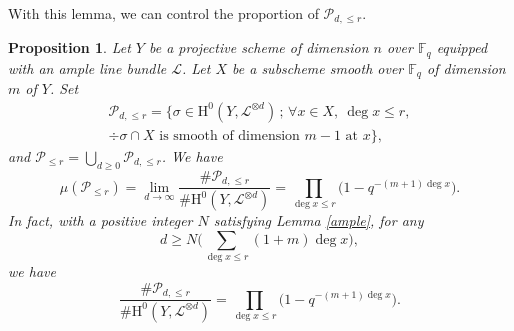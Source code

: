 \documentclass[11pt]{article}
\numberwithin{equation}{section}
\newcommand{\sep}{\,;\,}
\theoremstyle{plain}
\newtheorem{prop}[thm]{Proposition}
\theoremstyle{definition}
\newcommand{\ho}{\mathrm{H}}
\newcommand{\li}{\mathcal{L}}
\newcommand{\F}{\mathbb{F}}
\begin{document}
With this lemma, we can control the proportion of $\mathcal{P}_{d,\leq r}$.

\begin{prop}\label{smallf}
Let $Y$ be a projective scheme of dimension $n$ over $\F_q$ equipped with an ample line bundle $\li$. Let $X$ be a subscheme smooth over $\F_q$ of dimension $m$ of $Y$. Set
\begin{multline*}
\mathcal{P}_{d,\leq r}=\{ \sigma\in \ho^0(Y,\li^{\otimes d})\sep \forall x\in X,\ \deg x\leq r,\\ \div \sigma\cap X \text{ is smooth of dimension } m-1 \text{ at }x \},
\end{multline*}
and $\mathcal{P}_{\leq r}=\bigcup_{d\geq 0}\mathcal{P}_{d,\leq r}$.
We have
\[
\mu(\mathcal{P}_{\leq r})=\lim_{d\to \infty} \frac{\#\mathcal{P}_{d,\leq r}}{\#\ho^0(Y, \li^{\otimes d})}=\prod_{\deg x\leq r} \bigl(1-q^{-(m+1)\deg x} \bigr).
\]
In fact, with a positive integer $N$ satisfying Lemma \ref{ample}, for any
\[
d\geq N\bigl(\sum_{\deg x\leq r}(1+ m)\deg x\bigr),
\]
we have
\[
\frac{\#\mathcal{P}_{d,\leq r}}{\#\ho^0(Y, \li^{\otimes d})}=\prod_{\deg x\leq r} \bigl(1-q^{-(m+1)\deg x} \bigr).
\]
\end{prop}
\end{document}

